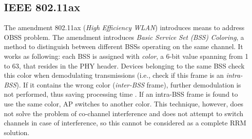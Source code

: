 \subsection {IEEE 802.11ax}
\label{chap:lr:sec:80211ax}

The amendment 802.11ax \cite{80211ax} (\textit{High Efficiency WLAN}) introduces means to address OBSS problem. The amendment introduces \textit{Basic Service Set (BSS) Coloring}, a method to distinguish between different BSSs operating on the same channel. It works as following: each BSS is assigned with \textit{color}, a 6-bit value spanning from 1 to 63, that resides in the PHY header. Devices belonging to the same BSS check this color when demodulating transmissions (i.e., check if this frame is an \textit{intra-BSS}). If it contains the wrong color (\textit{inter-BSS} frame), further demodulation is not performed, thus saving processing time \cite{CiscoCatalyst9800}. If an intra-BSS frame is found to use the same color, AP switches to another color. This technique, however, does not solve the problem of co-channel interference and does not attempt to switch channels in case of interference, so this cannot be considered as a complete RRM solution.



